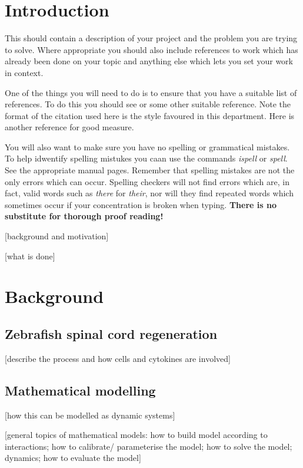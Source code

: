 \documentclass[12pt,a4paper]{report}
\begin{document}

\chapter{Introduction}
This should contain a description of your project and the problem you
are trying to solve. Where appropriate you should also include
references to work which has already been done on your topic and
anything else which lets you set your work in context.

One of the things you will need to do is to ensure that you have a
suitable list of references.  To do this you should see \cite{ref:lam}
or some other suitable reference.  Note the format of the citation used
here is the style favoured in this department.  Here is another
reference \cite{ref:bloggs} for good measure.

You will also want to make sure you have no spelling or grammatical
mistakes. To help idwentify spelling mistukes you caan use the commands
{\em ispell} or {\em spell}. See the appropriate manual pages. Remember
that spelling mistakes are not the only errors which can occur. Spelling
checkers will not find errors which are, in fact, valid words such as
{\em there} for {\em their}, nor will they find repeated words which
sometimes occur if your concentration is broken when typing. {\bf There
is no substitute for thorough proof reading!}


[background and motivation]

[what is done]

\chapter{Background}

\section{Zebrafish spinal cord regeneration}

[describe the process and how cells and cytokines are involved]

\section{Mathematical modelling}

[how this can be modelled as dynamic systems]

[general topics of mathematical models: how to build model according to interactions; how to calibrate/ parameterise the model; how to solve the model; dynamics; how to evaluate the model]
 
\end{document}
